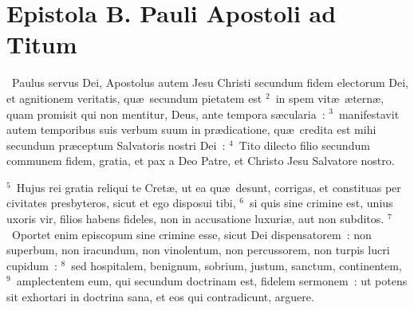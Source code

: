 {\centering \section*{Epistola B. Pauli Apostoli ad Titum}}\thispagestyle{empty}

~\lettrine[lines=10,image=true,loversize=0.05,lraise=-0.03]{P}{}aulus servus Dei, Apostolus autem Jesu Christi secundum fidem electorum Dei, et agnitionem veritatis, qu\ae\ secundum pietatem est
${}^{2}$~in spem vit\ae\ \ae tern\ae , quam promisit qui non mentitur, Deus, ante tempora s\ae cularia~:
${}^{3}$~manifestavit autem temporibus suis verbum suum in pr\ae dicatione, qu\ae\ credita est mihi secundum pr\ae ceptum Salvatoris nostri Dei~:
${}^{4}$~Tito dilecto filio secundum communem fidem, gratia, et pax a Deo Patre, et Christo Jesu Salvatore nostro.


${}^{5}$~Hujus rei gratia reliqui te Cret\ae , ut ea qu\ae\ desunt, corrigas, et constituas per civitates presbyteros, sicut et ego disposui tibi,
${}^{6}$~si quis sine crimine est, unius uxoris vir, filios habens fideles, non in accusatione luxuri\ae , aut non subditos.
${}^{7}$~Oportet enim episcopum sine crimine esse, sicut Dei dispensatorem~: non superbum, non iracundum, non vinolentum, non percussorem, non turpis lucri cupidum~:
${}^{8}$~sed hospitalem, benignum, sobrium, justum, sanctum, continentem,
${}^{9}$~amplectentem eum, qui secundum doctrinam est, fidelem sermonem~: ut potens sit exhortari in doctrina sana, et eos qui contradicunt, arguere.


